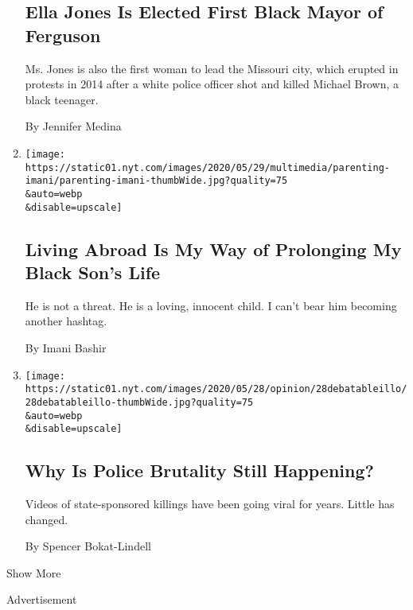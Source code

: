 \begin{enumerate}
  \hypertarget{ella-jones-is-elected-first-black-mayor-of-ferguson}{%
  \subsection{Ella Jones Is Elected First Black Mayor of
  Ferguson}\label{ella-jones-is-elected-first-black-mayor-of-ferguson}}

  Ms. Jones is also the first woman to lead the Missouri city, which
  erupted in protests in 2014 after a white police officer shot and
  killed Michael Brown, a black teenager.

  By Jennifer Medina
\item
  \href{/2020/05/29/parenting/black-child-safety-america.html}{}

  \texttt{[image: https://static01.nyt.com/images/2020/05/29/multimedia/parenting-imani/parenting-imani-thumbWide.jpg?quality=75\\\&auto=webp\\\&disable=upscale]}

  \hypertarget{living-abroad-is-my-way-of-prolonging-my-black-sons-life}{%
  \subsection{Living Abroad Is My Way of Prolonging My Black Son's
  Life}\label{living-abroad-is-my-way-of-prolonging-my-black-sons-life}}

  He is not a threat. He is a loving, innocent child. I can't bear him
  becoming another hashtag.

  By Imani Bashir
\item
  \href{/2020/05/28/opinion/minneapolis-police-brutality.html}{}

  \texttt{[image: https://static01.nyt.com/images/2020/05/28/opinion/28debatableillo/28debatableillo-thumbWide.jpg?quality=75\\\&auto=webp\\\&disable=upscale]}

  \hypertarget{why-is-police-brutality-still-happening}{%
  \subsection{Why Is Police Brutality Still
  Happening?}\label{why-is-police-brutality-still-happening}}

  Videos of state-sponsored killings have been going viral for years.
  Little has changed.

  By Spencer Bokat-Lindell
\end{enumerate}

Show More

Advertisement

